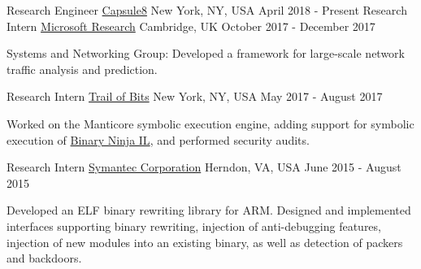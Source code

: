 

\begin{cventries}

  \cventry
    {Research Engineer}
		{\href{https://capsule8.com/}{Capsule8}} %
    {New York, NY, USA}
    {April 2018 - Present}
    {
    }
\vspace{0.1in}
  \cventry
    {Research Intern}
		{\href{https://www.microsoft.com/en-us/research/lab/microsoft-research-cambridge/}{Microsoft Research}} %
    {Cambridge, UK}
    {October 2017 - December 2017}
    {
      \begin{cvitems} %
      \item {Systems and Networking Group: Developed a framework for
          large-scale network traffic analysis and prediction.}
      \end{cvitems}
    }

\vspace{0.1in}

\cventry
    {Research Intern} %
		{\href{May 2017 - August 2017}{Trail of Bits}} %
    {New York, NY, USA}
    {May 2017 - August 2017}
    {
      \begin{cvitems} %
      \item {Worked on the Manticore symbolic execution engine, adding support
          for symbolic execution of \href{https://binary.ninja/}{Binary Ninja IL}, and performed security audits.}
      \end{cvitems}
    }

\vspace{0.1in}

  \cventry
    {Research Intern} %
		{\href{May 2015 - August 2015}{Symantec Corporation}} %
    {Herndon, VA, USA}
    {June 2015 - August 2015}
    {
      \begin{cvitems} %
        \item {Developed an ELF binary rewriting library for ARM. Designed and
            implemented interfaces supporting binary rewriting, injection of
              anti-debugging features, injection of new modules into an existing
              binary, as well as detection of packers and backdoors.}
      \end{cvitems}
    }



\end{cventries}
